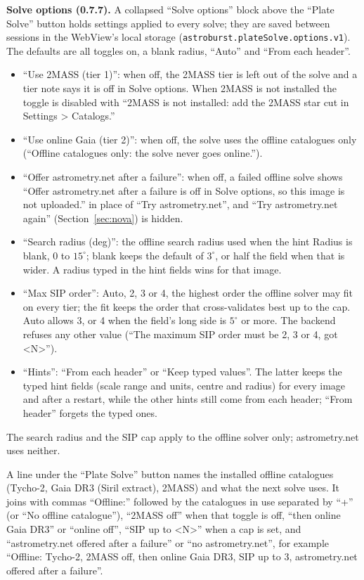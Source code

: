 \documentclass[11pt,a4paper]{article}
\newcommand{\code}[1]{\texttt{\small #1}}
\begin{document}
    \textbf{Solve options (0.7.7).} A collapsed ``Solve options'' block above the ``Plate Solve'' button holds settings applied to every solve; they are saved between sessions in the WebView's local storage (\code{astroburst.plateSolve.options.v1}). The defaults are all toggles on, a blank radius, ``Auto'' and ``From each header''.
    \begin{itemize}[nosep]
    \item ``Use 2MASS (tier 1)'': when off, the 2MASS tier is left out of the solve and a tier note says it is off in Solve options. When 2MASS is not installed the toggle is disabled with ``2MASS is not installed: add the 2MASS star cut in Settings > Catalogs.''
    \item ``Use online Gaia (tier 2)'': when off, the solve uses the offline catalogues only (``Offline catalogues only: the solve never goes online.'').
    \item ``Offer astrometry.net after a failure'': when off, a failed offline solve shows ``Offer astrometry.net after a failure is off in Solve options, so this image is not uploaded.'' in place of ``Try astrometry.net'', and ``Try astrometry.net again'' (Section~\ref{sec:nova}) is hidden.
    \item ``Search radius (deg)'': the offline search radius used when the hint Radius is blank, 0 to $15^{\circ}$; blank keeps the default of $3^{\circ}$, or half the field when that is wider. A radius typed in the hint fields wins for that image.
    \item ``Max SIP order'': Auto, 2, 3 or 4, the highest order the offline solver may fit on every tier; the fit keeps the order that cross-validates best up to the cap. Auto allows 3, or 4 when the field's long side is $5^{\circ}$ or more. The backend refuses any other value (``The maximum SIP order must be 2, 3 or 4, got \textless N\textgreater'').
    \item ``Hints'': ``From each header'' or ``Keep typed values''. The latter keeps the typed hint fields (scale range and units, centre and radius) for every image and after a restart, while the other hints still come from each header; ``From header'' forgets the typed ones.
    \end{itemize}
    The search radius and the SIP cap apply to the offline solver only; astrometry.net uses neither.

    A line under the ``Plate Solve'' button names the installed offline catalogues (Tycho-2, Gaia DR3 (Siril extract), 2MASS) and what the next solve uses. It joins with commas ``Offline:'' followed by the catalogues in use separated by ``+'' (or ``No offline catalogue''), ``2MASS off'' when that toggle is off, ``then online Gaia DR3'' or ``online off'', ``SIP up to \textless N\textgreater'' when a cap is set, and ``astrometry.net offered after a failure'' or ``no astrometry.net'', for example ``Offline: Tycho-2, 2MASS off, then online Gaia DR3, SIP up to 3, astrometry.net offered after a failure''.
\end{document}
